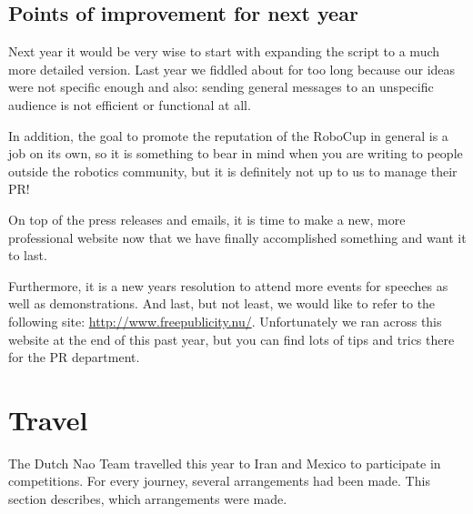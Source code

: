 \documentclass[a4paper]{article}
\begin{document}
\subsection{Points of improvement for next year}
Next year it would be very wise to start with expanding the script to a much more detailed version. Last year we fiddled about for too long because our ideas were not specific enough and also: sending general messages to an unspecific audience is not efficient or functional at all. 

In addition, the goal to promote the reputation of the RoboCup in general is a job on its own, so it is something to bear in mind when you are writing to people outside the robotics community, but it is definitely not up to us to manage their PR!

On top of the press releases and emails, it is time to make a new, more professional website now that we have finally accomplished something and want it to last.

Furthermore, it is a new years resolution to attend more events for speeches as well as demonstrations.
And last, but not least, we would like to refer to the following site: \url{http://www.freepublicity.nu/}. Unfortunately we ran across this website at the end of this past year, but you can find lots of tips and trics there for the PR department.

\section{Travel}
The Dutch Nao Team travelled this year to Iran and Mexico to participate in competitions. For every journey, several arrangements had been made. This section describes, which arrangements were made.

\end{document}
